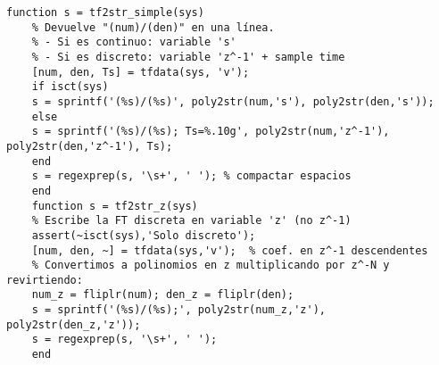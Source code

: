 \begin{lstlisting}[style=matlabstyle,caption={Guardado de resultados y figuras.}]
	function s = tf2str_simple(sys)
	% Devuelve "(num)/(den)" en una línea.
	% - Si es continuo: variable 's'
	% - Si es discreto: variable 'z^-1' + sample time
	[num, den, Ts] = tfdata(sys, 'v');
	if isct(sys)
	s = sprintf('(%s)/(%s)', poly2str(num,'s'), poly2str(den,'s'));
	else
	s = sprintf('(%s)/(%s); Ts=%.10g', poly2str(num,'z^-1'), poly2str(den,'z^-1'), Ts);
	end
	s = regexprep(s, '\s+', ' '); % compactar espacios
	end
	function s = tf2str_z(sys)
	% Escribe la FT discreta en variable 'z' (no z^-1)
	assert(~isct(sys),'Solo discreto');
	[num, den, ~] = tfdata(sys,'v');  % coef. en z^-1 descendentes
	% Convertimos a polinomios en z multiplicando por z^-N y revirtiendo:
	num_z = fliplr(num); den_z = fliplr(den);
	s = sprintf('(%s)/(%s);', poly2str(num_z,'z'), poly2str(den_z,'z'));
	s = regexprep(s, '\s+', ' ');
	end
\end{lstlisting}

